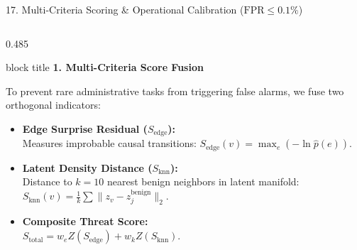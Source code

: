 \documentclass[aspectratio=169,10pt]{beamer}
\begin{document}
\begin{frame}[t]{17. Multi-Criteria Scoring \& Operational Calibration ($\text{FPR} \le 0.1\%$)}
\vspace{-0.2em}
\begin{columns}[T]
\begin{column}{0.485\textwidth}
\begin{beamercolorbox}[rounded=true,shadow=false,sep=0.28em,wd=\linewidth]{block title}
\textbf{\scriptsize 1. Multi-Criteria Score Fusion}
\end{beamercolorbox}
\vspace{0.08em}
{\fontsize{6.8pt}{9.2pt}\selectfont
To prevent rare administrative tasks from triggering false alarms, we fuse two orthogonal indicators:
\begin{itemize}\itemsep0.18em
  \item \textbf{Edge Surprise Residual ($S_{\text{edge}}$):}\\
  Measures improbable causal transitions:
  $S_{\text{edge}}(v) = \max_e (-\ln \hat{p}(e))$.
  \item \textbf{Latent Density Distance ($S_{\text{knn}}$):}\\
  Distance to $k=10$ nearest benign neighbors in latent manifold:
  $S_{\text{knn}}(v) = \frac{1}{k}\sum \|z_v - z_j^{\text{benign}}\|_2$.
  \item \textbf{Composite Threat Score:}\\
  $S_{\text{total}} = w_e Z(S_{\text{edge}}) + w_k Z(S_{\text{knn}})$.
\end{itemize}
}
\end{column}


\end{columns}
\end{frame}
\end{document}
